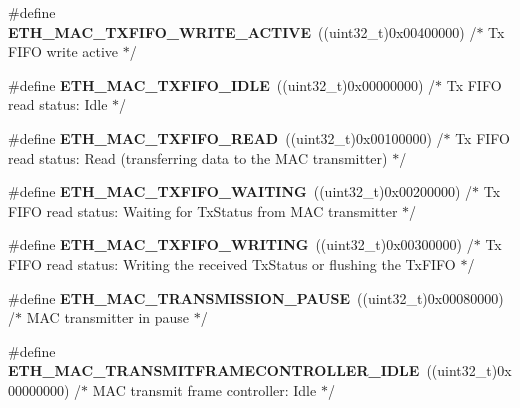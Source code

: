 \begin{DoxyCompactItemize}
\#define {\bfseries E\+T\+H\+\_\+\+M\+A\+C\+\_\+\+T\+X\+F\+I\+F\+O\+\_\+\+W\+R\+I\+T\+E\+\_\+\+A\+C\+T\+I\+VE}~((uint32\+\_\+t)0x00400000)  /$\ast$ Tx F\+I\+F\+O write active $\ast$/
\item 
\mbox{\label{group___h_a_l___e_t_h___aliased___defines_ga36e9938d6f099aab9f801d547d0a88a5}} 
\#define {\bfseries E\+T\+H\+\_\+\+M\+A\+C\+\_\+\+T\+X\+F\+I\+F\+O\+\_\+\+I\+D\+LE}~((uint32\+\_\+t)0x00000000)  /$\ast$ Tx F\+I\+F\+O read status\+: Idle $\ast$/
\item 
\mbox{\label{group___h_a_l___e_t_h___aliased___defines_ga162f3eb163f0fc63e0ef21f640ee3b35}} 
\#define {\bfseries E\+T\+H\+\_\+\+M\+A\+C\+\_\+\+T\+X\+F\+I\+F\+O\+\_\+\+R\+E\+AD}~((uint32\+\_\+t)0x00100000)  /$\ast$ Tx F\+I\+F\+O read status\+: Read (transferring data to the M\+A\+C transmitter) $\ast$/
\item 
\mbox{\label{group___h_a_l___e_t_h___aliased___defines_ga732d203562136a49e6fdfe08cbbdb007}} 
\#define {\bfseries E\+T\+H\+\_\+\+M\+A\+C\+\_\+\+T\+X\+F\+I\+F\+O\+\_\+\+W\+A\+I\+T\+I\+NG}~((uint32\+\_\+t)0x00200000)  /$\ast$ Tx F\+I\+F\+O read status\+: Waiting for Tx\+Status from M\+A\+C transmitter $\ast$/
\item 
\mbox{\label{group___h_a_l___e_t_h___aliased___defines_gaa98e266d20386f08f1e7d07924ae7fd8}} 
\#define {\bfseries E\+T\+H\+\_\+\+M\+A\+C\+\_\+\+T\+X\+F\+I\+F\+O\+\_\+\+W\+R\+I\+T\+I\+NG}~((uint32\+\_\+t)0x00300000)  /$\ast$ Tx F\+I\+F\+O read status\+: Writing the received Tx\+Status or flushing the Tx\+F\+I\+F\+O $\ast$/
\item 
\mbox{\label{group___h_a_l___e_t_h___aliased___defines_ga858c30b0c902a609fbf5e9de54c873fc}} 
\#define {\bfseries E\+T\+H\+\_\+\+M\+A\+C\+\_\+\+T\+R\+A\+N\+S\+M\+I\+S\+S\+I\+O\+N\+\_\+\+P\+A\+U\+SE}~((uint32\+\_\+t)0x00080000)  /$\ast$ M\+A\+C transmitter in pause $\ast$/
\item 
\mbox{\label{group___h_a_l___e_t_h___aliased___defines_ga3b6682322869b2f8ff8a34239418b229}} 
\#define {\bfseries E\+T\+H\+\_\+\+M\+A\+C\+\_\+\+T\+R\+A\+N\+S\+M\+I\+T\+F\+R\+A\+M\+E\+C\+O\+N\+T\+R\+O\+L\+L\+E\+R\+\_\+\+I\+D\+LE}~((uint32\+\_\+t)0x00000000)  /$\ast$ M\+A\+C transmit frame controller\+: Idle $\ast$/

\end{DoxyCompactItemize}
